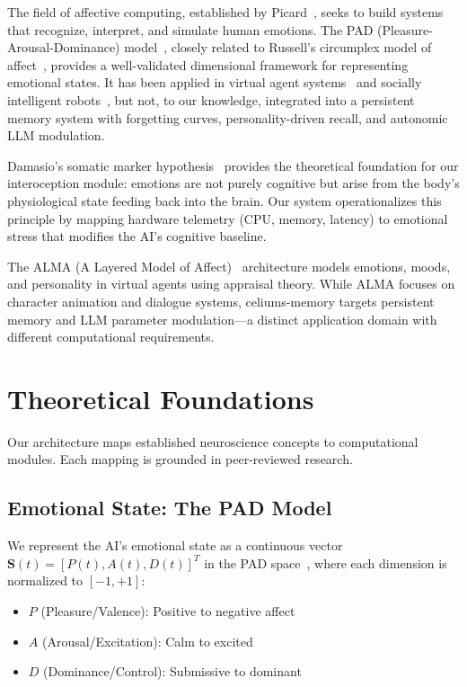 \documentclass[journal,twoside]{IEEEtran}
\begin{document}
The field of affective computing, established by Picard~\cite{picard1997}, seeks to build systems that recognize, interpret, and simulate human emotions. The PAD (Pleasure-Arousal-Dominance) model~\cite{mehrabian1996}, closely related to Russell's circumplex model of affect~\cite{russell1980}, provides a well-validated dimensional framework for representing emotional states. It has been applied in virtual agent systems~\cite{gebhard2022} and socially intelligent robots~\cite{breazeal2003}, but not, to our knowledge, integrated into a persistent memory system with forgetting curves, personality-driven recall, and autonomic LLM modulation.

Damasio's somatic marker hypothesis~\cite{damasio1994} provides the theoretical foundation for our interoception module: emotions are not purely cognitive but arise from the body's physiological state feeding back into the brain. Our system operationalizes this principle by mapping hardware telemetry (CPU, memory, latency) to emotional stress that modifies the AI's cognitive baseline.

The ALMA (A Layered Model of Affect)~\cite{gebhard2005} architecture models emotions, moods, and personality in virtual agents using appraisal theory. While ALMA focuses on character animation and dialogue systems, celiums-memory targets persistent memory and LLM parameter modulation—a distinct application domain with different computational requirements.

\section{Theoretical Foundations}

Our architecture maps established neuroscience concepts to computational modules. Each mapping is grounded in peer-reviewed research.

\subsection{Emotional State: The PAD Model}

We represent the AI's emotional state as a continuous vector $\mathbf{S}(t) = [P(t), A(t), D(t)]^T$ in the PAD space~\cite{mehrabian1996}, where each dimension is normalized to $[-1, +1]$:

\begin{itemize}
    \item $P$ (Pleasure/Valence): Positive to negative affect
    \item $A$ (Arousal/Excitation): Calm to excited
    \item $D$ (Dominance/Control): Submissive to dominant
\end{itemize}
\end{document}
